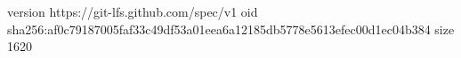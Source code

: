 version https://git-lfs.github.com/spec/v1
oid sha256:af0c79187005faf33c49df53a01eea6a12185db5778e5613efec00d1ec04b384
size 1620
